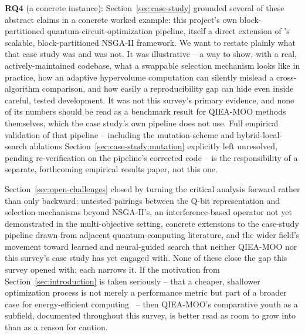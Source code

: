 \textbf{RQ4} (a concrete instance):
Section~\ref{sec:case-study} grounded several of these abstract claims
in a concrete worked example: this project's own block-partitioned
quantum-circuit-optimization pipeline, itself a direct extension of
\citet{ghlib2026scalable}'s scalable, block-partitioned NSGA-II
framework. We want to restate plainly what that case study was and was
not. It was illustrative -- a way to show, with a real,
actively-maintained codebase, what a swappable selection mechanism
looks like in practice, how an adaptive hypervolume computation can
silently mislead a cross-algorithm comparison, and how easily a
reproducibility gap can hide even inside careful, tested development.
It was not this survey's primary evidence, and none of its numbers
should be read as a benchmark result for QIEA-MOO methods themselves,
which the case study's own pipeline does not use. Full empirical
validation of that pipeline -- including the mutation-scheme and
hybrid-local-search ablations Section~\ref{sec:case-study:mutation}
explicitly left unresolved, pending re-verification on the pipeline's
corrected code -- is the responsibility of a separate, forthcoming
empirical results paper, not this one.

Section~\ref{sec:open-challenges} closed by turning the critical
analysis forward rather than only backward: untested pairings between
the Q-bit representation and selection mechanisms beyond NSGA-II's,
an interference-based operator not yet demonstrated in the
multi-objective setting, concrete extensions
to the case-study pipeline drawn from adjacent quantum-computing
literature, and the wider field's movement toward learned and
neural-guided search that neither QIEA-MOO nor this survey's case study
has yet engaged with. None of these close the gap this survey opened
with; each narrows it. If the motivation from
Section~\ref{sec:introduction} is taken seriously -- that a cheaper,
shallower optimization process is not merely a performance metric but
part of a broader case for energy-efficient
computing~\citep{banciu2026aiot,moga2025rlmicrogrid} -- then QIEA-MOO's
comparative youth as a subfield, documented throughout this survey, is
better read as room to grow into than as a reason for caution.
